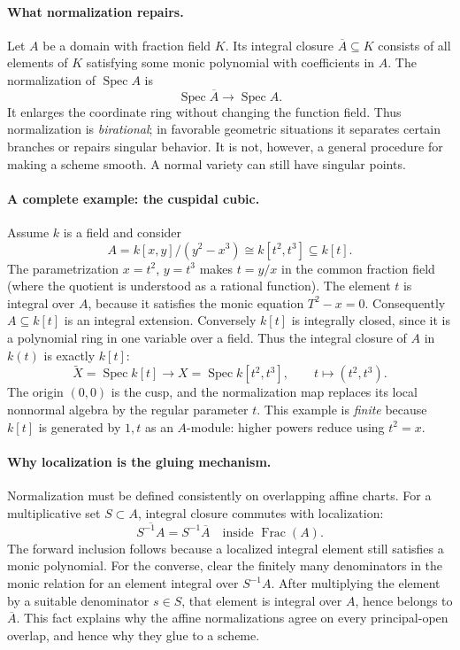 \paragraph{What normalization repairs.}
Let \(A\) be a domain with fraction field \(K\).  Its integral closure
\(\overline A\subseteq K\) consists of all elements of \(K\) satisfying
some monic polynomial with coefficients in \(A\).  The normalization
of \(\operatorname{Spec}A\) is
\[
 \operatorname{Spec}\overline A\longrightarrow\operatorname{Spec}A.
\]
It enlarges the coordinate ring without changing the function field.
Thus normalization is \emph{birational}; in favorable geometric
situations it separates certain branches or repairs singular behavior.
It is not, however, a general procedure for making a scheme smooth.
A normal variety can still have singular points.

\paragraph{A complete example: the cuspidal cubic.}
Assume \(k\) is a field and consider
\[
 A=k[x,y]/(y^2-x^3)\cong k[t^2,t^3]\subseteq k[t].
\]
The parametrization \(x=t^2\), \(y=t^3\) makes
\(t=y/x\) in the common fraction field (where the quotient is
understood as a rational function).
The element \(t\) is integral over \(A\), because it satisfies the
monic equation \(T^2-x=0\).  Consequently
\(A\subseteq k[t]\) is an integral extension.
Conversely \(k[t]\) is integrally closed, since it is a polynomial
ring in one variable over a field.  Thus the integral closure of
\(A\) in \(k(t)\) is exactly \(k[t]\):
\[
 \widetilde X=\operatorname{Spec}k[t]
 \longrightarrow
 X=\operatorname{Spec}k[t^2,t^3],
 \qquad t\longmapsto (t^2,t^3).
\]
The origin \((0,0)\) is the cusp, and the normalization map replaces its
local nonnormal algebra by the regular parameter \(t\).
This example is \emph{finite} because \(k[t]\) is generated by
\(1,t\) as an \(A\)-module: higher powers reduce using \(t^2=x\).

\paragraph{Why localization is the gluing mechanism.}
Normalization must be defined consistently on overlapping affine
charts.  For a multiplicative set \(S\subset A\), integral closure
commutes with localization:
\[
 \overline{S^{-1}A}=S^{-1}\overline A
 \quad\text{inside }\operatorname{Frac}(A).
\]
The forward inclusion follows because a localized integral element
still satisfies a monic polynomial.  For the converse, clear the
finitely many denominators in the monic relation for an element
integral over \(S^{-1}A\).  After multiplying the element by a
suitable denominator \(s\in S\), that element is integral over
\(A\), hence belongs to \(\overline A\).
This fact explains why the affine normalizations agree on every
principal-open overlap, and hence why they glue to a scheme.

